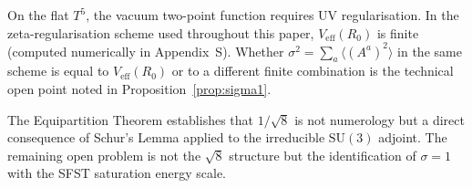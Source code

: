 \begin{remark}
  \label{rem:finite}
  On the flat $T^5$, the vacuum two-point function requires
  UV regularisation.  In the zeta-regularisation scheme
  used throughout this paper, $V_{\mathrm{eff}}(R_0)$ is finite
  (computed numerically in Appendix~S).  Whether
  $\sigma^2=\sum_a\langle(A^a)^2\rangle$ in the same scheme is
  equal to $V_{\mathrm{eff}}(R_0)$ or to a different finite combination
  is the technical open point noted in Proposition~\ref{prop:sigma1}.
\end{remark}

The Equipartition Theorem establishes that $1/\sqrt{8}$ is not numerology
but a direct consequence of Schur's Lemma applied to the irreducible
$\mathrm{SU}(3)$ adjoint.  The remaining open problem is not the
$\sqrt{8}$ structure but the identification of $\sigma=1$ with the
SFST saturation energy scale.
